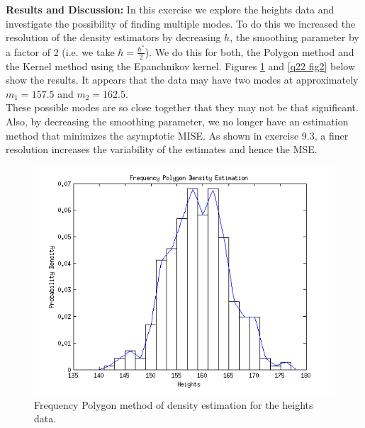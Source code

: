 \documentclass[12pt,a4paper]{article}
\begin{document}
\textbf{Results and Discussion:  } In this exercise we explore the heights data and investigate the possibility of finding multiple modes. To do this we increased the resolution of the density estimators by decreasing $h$, the smoothing parameter by a factor of 2 (i.e. we take $h = \frac{h^*}{2}$). We do this for both, the Polygon method and the Kernel method using the Epanchnikov kernel. Figures \ref{q22 fig1} and \ref{q22 fig2} below show the results. It appears that the data may have two modes at approximately $m_1 = 157.5$ and $m_2=162.5$.\\

These possible modes are so close together that they may not be that significant. Also, by decreasing the smoothing parameter, we no longer have an estimation method that minimizes the asymptotic MISE. As shown in exercise 9.3, a finer resolution increases the variability of the estimates and hence the MSE. 


\begin{figure}[ht!] 
\begin{center}
\includegraphics[scale=.86]{q9p22_graph1.png}
\caption{Frequency Polygon method of density estimation for the heights data.}
\label{q22 fig1}
\end{center}
\end{figure}
\FloatBarrier
\end{document}
